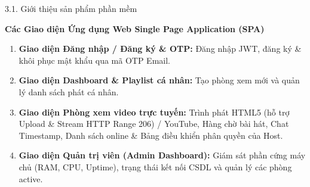 \documentclass[aspectratio=169,11pt]{beamer}
\begin{document}
\begin{frame}{3.1. Giới thiệu sản phẩm phần mềm}
    \begin{center}
        \textbf{\Large Các Giao diện Ứng dụng Web Single Page Application (SPA)}
    \end{center}
    \vspace{0.2cm}
    \begin{enumerate}
        \item \textbf{Giao diện Đăng nhập / Đăng ký \& OTP:} Đăng nhập JWT, đăng ký \& khôi phục mật khẩu qua mã OTP Email.
        \item \textbf{Giao diện Dashboard \& Playlist cá nhân:} Tạo phòng xem mới và quản lý danh sách phát cá nhân.
        \item \textbf{Giao diện Phòng xem video trực tuyến:} Trình phát HTML5 (hỗ trợ Upload \& Stream HTTP Range 206) / YouTube, Hàng chờ bài hát, Chat Timestamp, Danh sách online \& Bảng điều khiển phân quyền của Host.
        \item \textbf{Giao diện Quản trị viên (Admin Dashboard):} Giám sát phần cứng máy chủ (RAM, CPU, Uptime), trạng thái kết nối CSDL và quản lý các phòng active.
    \end{enumerate}
\end{frame}
\end{document}
